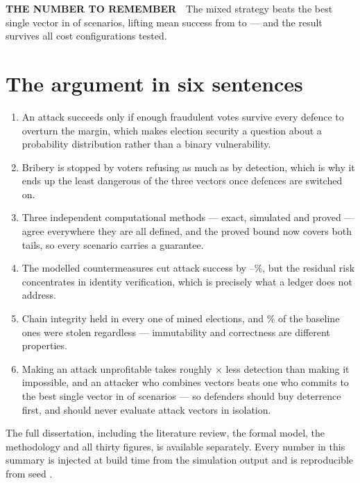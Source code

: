 \documentclass[11pt,a4paper]{article}
\newcommand{\keynumber}[1]{\textsf{\bfseries\footnotesize THE NUMBER TO REMEMBER}\ \ #1}
\begin{document}
\begin{numberbox}
\keynumber{The mixed strategy beats the best single vector in
\CoalitionBetterCount{} of \CoalitionScenarioCount{} scenarios, lifting
mean success from \BestPureMeanBaseline{} to \CoalitionMeanBaseline{}
--- and the result survives all \SensitivityConfigs{} cost
configurations tested.}
\end{numberbox}

\clearpage
\section*{The argument in six sentences}

\begin{enumerate}[leftmargin=1.6em,itemsep=5pt]
\item An attack succeeds only if enough fraudulent votes survive every
      defence to overturn the margin, which makes election security a
      question about a probability distribution rather than a binary
      vulnerability.
\item Bribery is stopped by voters refusing as much as by detection,
      which is why it ends up the least dangerous of the three vectors
      once defences are switched on.
\item Three independent computational methods --- exact, simulated and
      proved --- agree everywhere they are all defined, and the proved
      bound now covers both tails, so every scenario carries a
      guarantee.
\item The modelled countermeasures cut attack success by
      \SybilRelReduction--\BriberyRelReduction\%, but the residual risk
      concentrates in identity verification, which is precisely what a
      ledger does not address.
\item Chain integrity held in every one of \ElectionTrials{} mined
      elections, and \FlipBriberyBaseline\% of the baseline ones were
      stolen regardless --- immutability and correctness are different
      properties.
\item Making an attack unprofitable takes roughly
      \ProtectionHeadroom$\times$ less detection than making it
      impossible, and an attacker who combines vectors beats one who
      commits to the best single vector in
      \CoalitionBetterCount{} of \CoalitionScenarioCount{} scenarios ---
      so defenders should buy deterrence first, and should never
      evaluate attack vectors in isolation.
\end{enumerate}

\vfill
{\footnotesize\color{inkmuted}
The full dissertation, including the literature review, the formal
model, the methodology and all thirty figures, is available separately.
Every number in this summary is injected at build time from the
simulation output and is reproducible from seed \Seed.}
\end{document}
